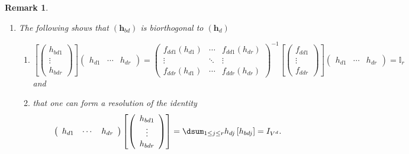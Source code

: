 \documentclass[aps,preprint]{revtex4}
\newtheorem{remark}[theorem]{Remark}
\begin{document}
\begin{remark}
\begin{enumerate}
\item The following shows that $\left( \boldsymbol{h}_{bd}\right) $ is
biorthogonal to $\left( \boldsymbol{h}_{d}\right) $

\begin{enumerate}
\item 
\begin{equation}
\left[ \left( 
\begin{array}{c}
h_{bd1} \\ 
\vdots \\ 
h_{bdr}%
\end{array}%
\right) \right] \left( 
\begin{array}{ccc}
h_{d1} & \cdots & h_{dr}%
\end{array}%
\right) =\left( 
\begin{array}{ccc}
f_{dd1}\left( h_{d1}\right) & \cdots & f_{dd1}\left( h_{dr}\right) \\ 
\vdots & \ddots & \vdots \\ 
f_{ddr}\left( h_{d1}\right) & \cdots & f_{ddr}\left( h_{dr}\right)%
\end{array}%
\right) ^{-1}\left[ \left( 
\begin{array}{c}
f_{dd1} \\ 
\vdots \\ 
f_{ddr}%
\end{array}%
\right) \right] \left( 
\begin{array}{ccc}
h_{d1} & \cdots & h_{dr}%
\end{array}%
\right) =\mathbb{I}_{r}
\end{equation}%
and

\item that one can form a resolution of the identity 
\begin{equation}
\left( 
\begin{array}{ccc}
h_{d1} & \cdots & h_{dr}%
\end{array}%
\right) \left[ \left( 
\begin{array}{c}
h_{bd1} \\ 
\vdots \\ 
h_{bdr}%
\end{array}%
\right) \right] =\dsum_{1\leq j\leq r}h_{dj}\left[ h_{bdj}\right] =I_{V^{d}}.
\end{equation}
\end{enumerate}
\end{enumerate}
\end{remark}
\end{document}
